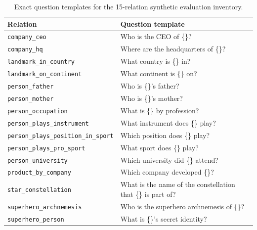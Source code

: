 \begin{table}[t]
\centering
\scriptsize
\setlength{\tabcolsep}{4pt}
\begin{tabularx}{\textwidth}{@{}lX@{}}
\toprule
\textbf{Relation} & \textbf{Question template} \\
\midrule
\texttt{company\_ceo} & Who is the CEO of \{\}? \\
\texttt{company\_hq} & Where are the headquarters of \{\}? \\
\texttt{landmark\_in\_country} & What country is \{\} in? \\
\texttt{landmark\_on\_continent} & What continent is \{\} on? \\
\texttt{person\_father} & Who is \{\}'s father? \\
\texttt{person\_mother} & Who is \{\}'s mother? \\
\texttt{person\_occupation} & What is \{\} by profession? \\
\texttt{person\_plays\_instrument} & What instrument does \{\} play? \\
\texttt{person\_plays\_position\_in\_sport} & Which position does \{\} play? \\
\texttt{person\_plays\_pro\_sport} & What sport does \{\} play? \\
\texttt{person\_university} & Which university did \{\} attend? \\
\texttt{product\_by\_company} & Which company developed \{\}? \\
\texttt{star\_constellation} & What is the name of the constellation that \{\} is part of? \\
\texttt{superhero\_archnemesis} & Who is the superhero archnemesis of \{\}? \\
\texttt{superhero\_person} & What is \{\}'s secret identity? \\
\bottomrule
\end{tabularx}
\caption{Exact question templates for the 15-relation synthetic evaluation inventory.}
\label{tab:prompt_templates_15}
\end{table}

